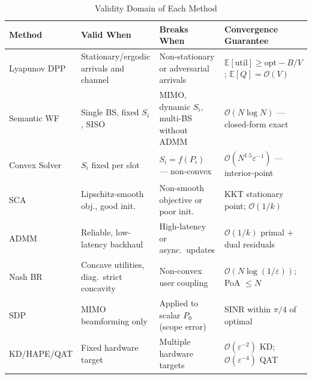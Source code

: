 \documentclass[conference]{IEEEtran}
\begin{document}
\begin{table}[!t]
\renewcommand{\arraystretch}{1.22}
\caption{Validity Domain of Each Method}
\label{tab:validity2}
\centering
\begin{tabular}{@{}p{2.4cm} p{3.4cm} p{3.5cm} p{4.5cm}@{}}
\toprule
\textbf{Method} & \textbf{Valid When} & \textbf{Breaks When} & \textbf{Convergence Guarantee} \\
\midrule
Lyapunov DPP  & Stationary/ergodic arrivals and channel &
Non-stationary or adversarial arrivals &
$\mathbb{E}[\text{util}]\ge\text{opt}-B/V$;\; $\mathbb{E}[Q]=\mathcal{O}(V)$ \\

Semantic WF &
Single BS, fixed $S_i$, SISO &
MIMO, dynamic $S_i$, multi-BS without ADMM &
$\mathcal{O}(N\log N)$ --- closed-form exact \\

Convex Solver &
$S_i$ fixed per slot &
$S_i = f(P_i)$ --- non-convex &
$\mathcal{O}(N^{1.5}\varepsilon^{-1})$ --- interior-point \\

SCA &
Lipschitz-smooth obj., good init. &
Non-smooth objective or poor init. &
KKT stationary point; $\mathcal{O}(1/k)$ \\

ADMM &
Reliable, low-latency backhaul &
High-latency or async.\ updates &
$\mathcal{O}(1/k)$ primal $+$ dual residuals \\

Nash BR &
Concave utilities, diag.\ strict concavity &
Non-convex user coupling &
$\mathcal{O}(N\log(1/\varepsilon))$; PoA $\le N$ \\

SDP &
MIMO beamforming only &
Applied to scalar $P_0$ (scope error) &
SINR within $\pi/4$ of optimal \\

KD/HAPE/QAT &
Fixed hardware target &
Multiple hardware targets &
$\mathcal{O}(\varepsilon^{-2})$ KD; $\mathcal{O}(\varepsilon^{-4})$ QAT \\
\bottomrule
\end{tabular}
\end{table}
\end{document}
